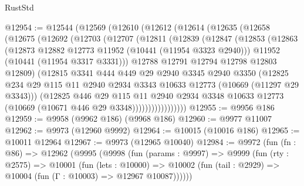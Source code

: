 \begin{lexlean}{RustStd}
\begin{coremodule}
@12954 := @12544
    (@12569
      (@12610
        (@12612
          (@12614
            (@12635
              (@12658
                (@12675
                  (@12692
                    (@12703
                      (@12707
                        (@12811
                          (@12839
                            (@12847
                              (@12853
                                (@12863
                                  (@12873 @12882 @12773 @11952 (@10441 (@11954 @3323 @2940)))
                                  @11952
                                  (@10441 (@11954 @3317 @3331)))
                                @12788
                                @12791
                                @12794
                                @12798
                                @12803
                                @12809)
                              (@12815
                                @3341
                                @444
                                @449
                                @29
                                @2940
                                @3345
                                @2940
                                @3350
                                (@12825
                                  @234
                                  @29
                                  @115
                                  @11
                                  @2940
                                  @2934
                                  @3343
                                  @10633
                                  @12773
                                  (@10669 (@11297 @29 @3343)))
                                (@12825
                                  @446
                                  @29
                                  @115
                                  @11
                                  @2940
                                  @2934
                                  @3348
                                  @10633
                                  @12773
                                  (@10669 (@10671 @446 @29 @3348)))))))))))))))))
@12955 := @9956 @186
@12959 := @9958 (@9962 @186) (@9968 @186)
@12960 := @9977 @11007
@12962 := @9973 (@12960 @9992)
@12964 := @10015 (@10016 @186)
@12965 := @10011 @12964
@12967 := @9973 (@12965 @10040)
@12984 := @9972
    (fun (fn : @86) =>
    @12962
      (@9995
        (@9998
          (fun (params : @9997) =>
          @9999
            (fun (rty : @2575) =>
            @10001
              (fun (lets : @10000) =>
              @10002 (fun (tail : @2929) => @10004 (fun (Γ : @10003) => @12967 @10087))))))

\end{coremodule}
\end{lexlean}
